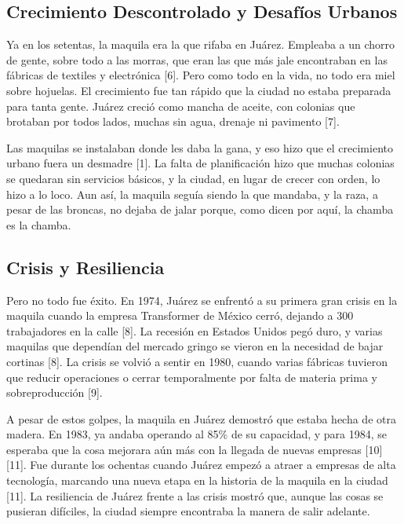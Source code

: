 \documentclass[
  letterpaper,
]{book}
\begin{document}
\subsection{Crecimiento Descontrolado y Desafíos
Urbanos}\label{crecimiento-descontrolado-y-desafuxedos-urbanos}

Ya en los setentas, la maquila era la que rifaba en Juárez. Empleaba a
un chorro de gente, sobre todo a las morras, que eran las que más jale
encontraban en las fábricas de textiles y electrónica {[}6{]}. Pero como
todo en la vida, no todo era miel sobre hojuelas. El crecimiento fue tan
rápido que la ciudad no estaba preparada para tanta gente. Juárez creció
como mancha de aceite, con colonias que brotaban por todos lados, muchas
sin agua, drenaje ni pavimento {[}7{]}.

Las maquilas se instalaban donde les daba la gana, y eso hizo que el
crecimiento urbano fuera un desmadre {[}1{]}. La falta de planificación
hizo que muchas colonias se quedaran sin servicios básicos, y la ciudad,
en lugar de crecer con orden, lo hizo a lo loco. Aun así, la maquila
seguía siendo la que mandaba, y la raza, a pesar de las broncas, no
dejaba de jalar porque, como dicen por aquí, la chamba es la chamba.

\subsection{Crisis y Resiliencia}\label{crisis-y-resiliencia}

Pero no todo fue éxito. En 1974, Juárez se enfrentó a su primera gran
crisis en la maquila cuando la empresa Transformer de México cerró,
dejando a 300 trabajadores en la calle {[}8{]}. La recesión en Estados
Unidos pegó duro, y varias maquilas que dependían del mercado gringo se
vieron en la necesidad de bajar cortinas {[}8{]}. La crisis se volvió a
sentir en 1980, cuando varias fábricas tuvieron que reducir operaciones
o cerrar temporalmente por falta de materia prima y sobreproducción
{[}9{]}.

A pesar de estos golpes, la maquila en Juárez demostró que estaba hecha
de otra madera. En 1983, ya andaba operando al 85\% de su capacidad, y
para 1984, se esperaba que la cosa mejorara aún más con la llegada de
nuevas empresas {[}10{]}{[}11{]}. Fue durante los ochentas cuando Juárez
empezó a atraer a empresas de alta tecnología, marcando una nueva etapa
en la historia de la maquila en la ciudad {[}11{]}. La resiliencia de
Juárez frente a las crisis mostró que, aunque las cosas se pusieran
difíciles, la ciudad siempre encontraba la manera de salir adelante.
\end{document}
